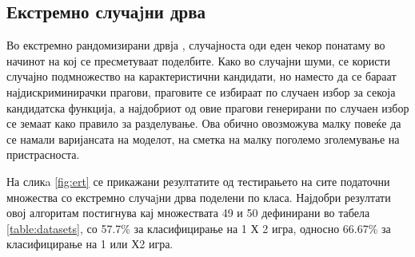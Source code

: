 \subsection{Екстремно случаjни дрва}

Во екстремно рандомизирани дрвја \cite{geurts2006extremely}, случајноста оди еден чекор понатаму во начинот на кој се пресметуваат поделбите. Како во случајни шуми, се користи случајно подмножество на карактеристични кандидати, но наместо да се бараат најдискриминирачки прагови, праговите се избираат по случаен избор за секоја кандидатска функција, а најдобриот од овие прагови генерирани по случаен избор се земаат како правило за разделување. Ова обично овозможува малку повеќе да се намали варијансата на моделот, на сметка на малку поголемо зголемување на пристрасноста.

На сликa \ref{fig:ert} се прикажани резултатите од тестирањето на сите податочни множества со екстремно случаjни дрва поделени по класа. Најдобри резултати овој алгоритам постигнува кај множествата 49 и 50 дефинирани во табела \ref{table:datasets}, со 57.7\% за класифицирање на 1 Х 2 игра, односно 66.67\% за класифицирање на 1 или Х2 игра.

